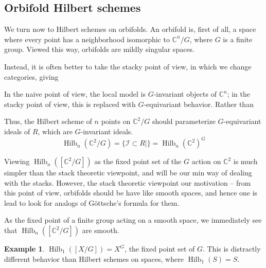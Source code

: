 \documentclass{amsart}[12pt]
\theoremstyle{definition}
\newtheorem{example}[dummy]{Example}
\newcommand{\C}{\mathbb{C}}
\DeclareMathOperator{\Hilb}{Hilb}
\begin{document}
\subsection{Orbifold Hilbert schemes}

We turn now to Hilbert schemes on orbifolds.  An orbifold is, first of all, a space where every point has a neighborhood isomorphic to $\C^n/G$, where $G$ is a finite group.  Viewed this way, orbifolds are mildly singular spaces.  

Instead, it is often better to take the stacky point of view, in which we change categories, giving 


In the naive point of view, the local model is $G$-invariant objects of $\C^n$; in the stacky point of view, this is replaced with $G$-equivariant behavior.  Rather than 


Thus, the Hilbert scheme of $n$ points on $\C^2/G$ should parameterize $G$-equivariant ideals of $R$, which are $G$-invariant ideals.  
$$\Hilb_n(\C^2/G)=\{\mathcal{I}\subset R | \} =\Hilb_n(\C^2)^G$$

Viewing $\Hilb_n([\C^2/G])$ as the fixed point set of the $G$ action on $\C^2$ is much simpler than the stack theoretic viewpoint, and will be our min way of dealing with the stacks.  However, the stack theoretic viewpoint our motivation -- from this point of view, orbifolds should be have like smooth spaces, and hence one is lead to look for analogs of G\"ottsche's formula for them.


As the fixed point of a finite group acting on a smooth space, we immediately see that $\Hilb_n([\C^2/G])$ are smooth.



\begin{example}
$\Hilb_1([X/G])=X^G$, the fixed point set of $G$.  This is distractly different behavior than Hilbert schemes on spaces, where $\Hilb_1(S)=S$.
\end{example}
\end{document}
